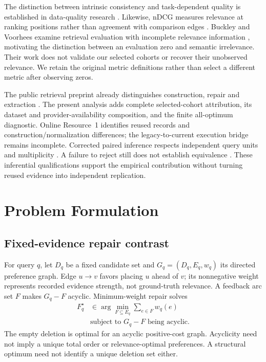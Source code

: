 \documentclass[pdflatex,iicol,sn-basic,Numbered]{sn-jnl}
\begin{document}
The distinction between intrinsic consistency and task-dependent quality is established in data-quality research \cite{wang1996beyond}. Likewise, nDCG measures relevance at ranking positions rather than agreement with comparison edges \cite{jarvelin2002cumulated}. Buckley and Voorhees examine retrieval evaluation with incomplete relevance information \cite{buckley2004incomplete}, motivating the distinction between an evaluation zero and semantic irrelevance. Their work does not validate our selected cohorts or recover their unobserved relevance. We retain the original metric definitions rather than select a different metric after observing zeros.

The public retrieval preprint already distinguishes construction, repair and extraction \cite{vahidi2026retrievalpreprint}. The present analysis adds complete selected-cohort attribution, its dataset and provider-availability composition, and the finite all-optimum diagnostic. Online Resource~1 identifies reused records and construction/normalization differences; the legacy-to-current execution bridge remains incomplete. Corrected paired inference respects independent query units and multiplicity \cite{urbano2019statistical,carterette2012multiple}. A failure to reject still does not establish equivalence \cite{lakens2018equivalence}. These inferential qualifications support the empirical contribution without turning reused evidence into independent replication.

\section{Problem Formulation}\label{sec:problem}
\subsection{Fixed-evidence repair contrast}
For query $q$, let $D_q$ be a fixed candidate set and $G_q=(D_q,E_q,w_q)$ its directed preference graph. Edge $u\to v$ favors placing $u$ ahead of $v$; its nonnegative weight represents recorded evidence strength, not ground-truth relevance. A feedback arc set $F$ makes $G_q-F$ acyclic. Minimum-weight repair solves
\begin{equation}
\begin{aligned}F_q^\star&\in\arg\min_{F\subseteq E_q}\sum_{e\in F}w_q(e)\\
&\text{subject to }G_q-F\text{ being acyclic}.\end{aligned}
\label{eq:mwfas}
\end{equation}
The empty deletion is optimal for an acyclic positive-cost graph. Acyclicity need not imply a unique total order or relevance-optimal preferences. A structural optimum need not identify a unique deletion set either.
\end{document}
